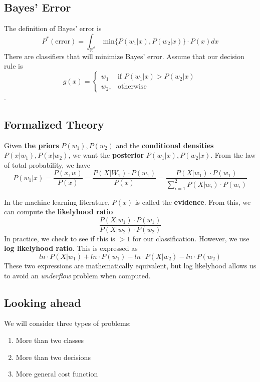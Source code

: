\documentclass[12pt]{article}
\begin{document}
\subsection{Bayes' Error}

The definition of Bayes' error is \[P^{*}(\text{error}) = \int_{\mathbb{R}^d}\text{ min}\{P(w_1 | x), P(w_2 | x)\} \cdot P(x) dx\] There are classifiers that will minimize Bayes' error. Assume that our decision rule is 
\[ g(x) = 
\begin{cases}
    w_1 & \text{if } P(w_1|x) > P(w_2 | x)\\
    w_2,              & \text{otherwise}
\end{cases}
\]
.

\subsection{Formalized Theory}

Given \textbf{the priors} $P(w_1), P(w_2)$ and the \textbf{conditional densities} $P(x | w_1), P(x | w_2)$, we want the \textbf{posterior} $P(w_1 | x), P(w_2 | x)$. From the law of total probability, we have
\[
P(w_1 | x) = \frac{P(x, w)}{P(x)} = \frac{P(X | W_1) \cdot P(w_1)}{P(x)} = \frac{P(X | w_1) \cdot P(w_1)}{\sum \limits_{i=1}^{2} P(X | w_i) \cdot P(w_i)}
\]

In the machine learning literature, $P(x)$ is called the \textbf{evidence}. From this, we can compute the \textbf{likelyhood ratio} \[\frac{P(X | w_1) \cdot P(w_1)}{P(X | w_2) \cdot P(w_2)}\] In practice, we check to see if this is $> 1$ for our classification. However, we use \textbf{log likelyhood ratio}. This is expressed as \[ln \cdot P(X | w_1) + ln \cdot P(w_1) - ln \cdot P(X | w_2) - ln \cdot P(w_2)\]These two expressions are mathematically equivalent, but log likelyhood allows us to avoid an \textit{underflow} problem when computed.

\subsection{Looking ahead}

We will consider three types of problems:

\begin{enumerate}[noitemsep]
\item More than two classes
\item More than two decisions
\item More general cost function
\end{enumerate}
\end{document}
